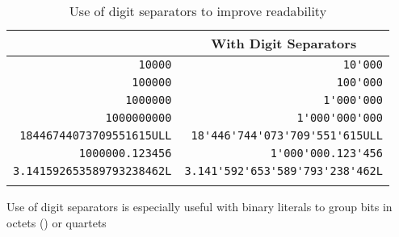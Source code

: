 \begin{table}[h!]
\begin{center}
\begin{threeparttable}
\caption{Use of digit separators to improve readability}\label{digitseparator-table1}\vspace{1.5ex}
{\small \begin{tabular}{c|c}\thickhline
\rowcolor[gray]{.9}{\sffamily\bfseries Without Digit Separator} & {\sffamily\bfseries With Digit Separators} \\ \hline
\multicolumn{1}{r|}{\lstinline!10000!} & \multicolumn{1}{r}{\lstinline!10'000!} \\ \hline 
\multicolumn{1}{r|}{\lstinline!100000!} & \multicolumn{1}{r}{\lstinline!100'000!} \\ \hline 
\multicolumn{1}{r|}{\lstinline!1000000!} & \multicolumn{1}{r}{\lstinline!1'000'000!} \\ \hline 
\multicolumn{1}{r|}{\lstinline!1000000000!} & \multicolumn{1}{r}{\lstinline!1'000'000'000!} \\ \hline
\multicolumn{1}{r|}{\lstinline!18446744073709551615ULL!} & \multicolumn{1}{r}{\lstinline!18'446'744'073'709'551'615ULL!} \\ \hline 
\multicolumn{1}{r|}{\lstinline!1000000.123456!} & \multicolumn{1}{r}{\lstinline!1'000'000.123'456!} \\ \hline 
\multicolumn{1}{r|}{\lstinline!3.141592653589793238462L!} & \multicolumn{1}{r}{\lstinline!3.141'592'653'589'793'238'462L!} \\ \thickhline
\end{tabular}
} %
\end{threeparttable}
\end{center} 
\end{table} 
\noindent Use of digit separators is especially useful with binary
literals to group bits in octets () or quartets
